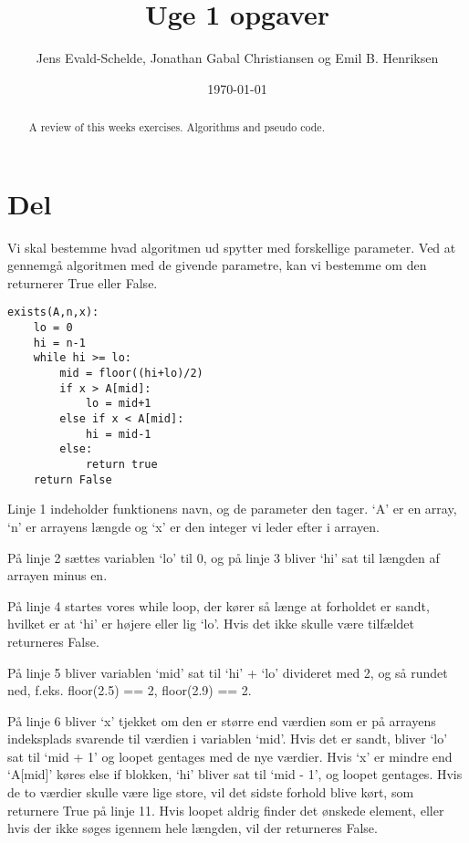 \documentclass{article}
\begin{document}
\title{Uge 1 opgaver}
\author{Jens Evald-Schelde, Jonathan Gabal Christiansen og Emil B. Henriksen}

\date{\today}
\maketitle
\renewcommand{\abstractname}{Abstract}
\begin{abstract}
	A review of this weeks exercises. Algorithms and pseudo code.
\end{abstract}

\section{Del}
Vi skal bestemme hvad algoritmen ud spytter med forskellige parameter.\newline
Ved at gennemgå algoritmen med de givende parametre, kan vi bestemme om den returnerer True eller False.

\lstset{language=Python,numbers=left,stepnumber=1}
\begin{lstlisting}[frame=single]
exists(A,n,x):
	lo = 0 
	hi = n-1 
	while hi >= lo:
		mid = floor((hi+lo)/2)
		if x > A[mid]:  
			lo = mid+1
		else if x < A[mid]:
			hi = mid-1
		else:
			return true
	return False
\end{lstlisting}

Linje 1 indeholder funktionens navn, og de parameter den tager. `A' er en array, `n' er arrayens længde og `x' er den integer vi leder efter i arrayen.

På linje 2 sættes variablen `lo' til 0, og på linje 3 bliver `hi' sat til længden af arrayen minus en.

På linje 4 startes vores while loop, der kører så længe at forholdet er sandt, hvilket er at `hi' er højere eller lig `lo'. Hvis det ikke skulle være tilfældet returneres False.

På linje 5 bliver variablen `mid' sat til `hi' + `lo' divideret med 2, og så rundet ned, f.eks. floor(2.5) == 2, floor(2.9) == 2.

På linje 6 bliver `x' tjekket om den er større end værdien som er på arrayens indeksplads svarende til værdien i variablen `mid'. Hvis det er sandt, bliver `lo' sat til `mid + 1' og loopet gentages med de nye værdier. Hvis `x' er mindre end `A[mid]' køres else if blokken, `hi' bliver sat til `mid - 1', og loopet gentages.\newline
Hvis de to værdier skulle være lige store, vil det sidste forhold blive kørt, som returnere True på linje 11. Hvis loopet aldrig finder det ønskede element, eller hvis der ikke søges igennem hele længden, vil der returneres False.
\newline
\end{document}
